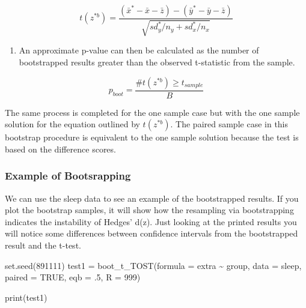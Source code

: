 \documentclass[
]{interact}
\newenvironment{Shaded}{\begin{snugshade}}{\end{snugshade}}
\newcommand{\AttributeTok}[1]{\textcolor[rgb]{0.40,0.45,0.13}{#1}}
\newcommand{\ConstantTok}[1]{\textcolor[rgb]{0.56,0.35,0.01}{#1}}
\newcommand{\DecValTok}[1]{\textcolor[rgb]{0.68,0.00,0.00}{#1}}
\newcommand{\FunctionTok}[1]{\textcolor[rgb]{0.28,0.35,0.67}{#1}}
\newcommand{\NormalTok}[1]{\textcolor[rgb]{0.00,0.23,0.31}{#1}}
\newcommand{\OtherTok}[1]{\textcolor[rgb]{0.00,0.23,0.31}{#1}}
\newcommand{\SpecialCharTok}[1]{\textcolor[rgb]{0.37,0.37,0.37}{#1}}
\providecommand{\tightlist}{%
  \setlength{\itemsep}{0pt}\setlength{\parskip}{0pt}}\usepackage{longtable,booktabs,array}
\begin{document}
\[
t(z^{*b}) = \frac {(\bar x^*-\bar x - \bar z) - (\bar y^*-\bar y - \bar z)}{\sqrt {sd_y^*/n_y + sd_x^*/n_x}}
\]

\begin{enumerate}
\def\labelenumi{\arabic{enumi}.}
\setcounter{enumi}{2}
\tightlist
\item
  An approximate p-value can then be calculated as the number of
  bootstrapped results greater than the observed t-statistic from the
  sample.
\end{enumerate}

\[
p_{boot} = \frac {\#t(z^{*b}) \ge t_{sample}}{B}
\]

The same process is completed for the one sample case but with the one
sample solution for the equation outlined by \(t(z^{*b})\). The paired
sample case in this bootstrap procedure is equivalent to the one sample
solution because the test is based on the difference scores.

\newpage

\hypertarget{example-of-bootsrapping}{%
\subsubsection{Example of Bootsrapping}\label{example-of-bootsrapping}}

We can use the sleep data to see an example of the bootstrapped results.
If you plot the bootstrap samples, it will show how the resampling via
bootstrapping indicates the instability of Hedges' d(z). Just looking at
the printed results you will notice some differences between confidence
intervals from the bootstrapped result and the t-test.

\begin{Shaded}
\begin{Highlighting}[]
\FunctionTok{set.seed}\NormalTok{(}\DecValTok{891111}\NormalTok{)}
\NormalTok{test1 }\OtherTok{=} \FunctionTok{boot\_t\_TOST}\NormalTok{(}\AttributeTok{formula =}\NormalTok{ extra }\SpecialCharTok{\textasciitilde{}}\NormalTok{ group,}
                    \AttributeTok{data =}\NormalTok{ sleep,}
                    \AttributeTok{paired =} \ConstantTok{TRUE}\NormalTok{,}
                    \AttributeTok{eqb =}\NormalTok{ .}\DecValTok{5}\NormalTok{,}
                    \AttributeTok{R =} \DecValTok{999}\NormalTok{)}


\FunctionTok{print}\NormalTok{(test1)}
\end{Highlighting}
\end{Shaded}
\end{document}

